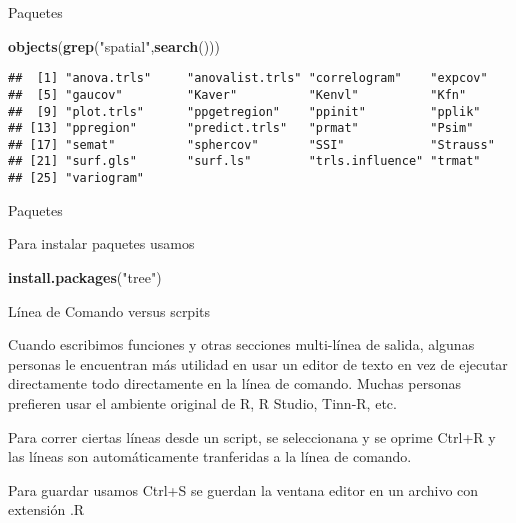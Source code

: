 \documentclass[ignorenonframetext,]{beamer}
\newenvironment{Shaded}{\begin{snugshade}}{\end{snugshade}}
\newcommand{\KeywordTok}[1]{\textcolor[rgb]{0.13,0.29,0.53}{\textbf{#1}}}
\newcommand{\StringTok}[1]{\textcolor[rgb]{0.31,0.60,0.02}{#1}}
\newcommand{\NormalTok}[1]{#1}
\begin{document}
\begin{frame}[fragile]{Paquetes}

\begin{Shaded}
\begin{Highlighting}[]
\KeywordTok{objects}\NormalTok{(}\KeywordTok{grep}\NormalTok{(}\StringTok{"spatial"}\NormalTok{,}\KeywordTok{search}\NormalTok{()))}
\end{Highlighting}
\end{Shaded}

\begin{verbatim}
##  [1] "anova.trls"     "anovalist.trls" "correlogram"    "expcov"        
##  [5] "gaucov"         "Kaver"          "Kenvl"          "Kfn"           
##  [9] "plot.trls"      "ppgetregion"    "ppinit"         "pplik"         
## [13] "ppregion"       "predict.trls"   "prmat"          "Psim"          
## [17] "semat"          "sphercov"       "SSI"            "Strauss"       
## [21] "surf.gls"       "surf.ls"        "trls.influence" "trmat"         
## [25] "variogram"
\end{verbatim}

\end{frame}

\begin{frame}[fragile]{Paquetes}

Para instalar paquetes usamos

\begin{Shaded}
\begin{Highlighting}[]
\KeywordTok{install.packages}\NormalTok{(}\StringTok{"tree"}\NormalTok{)}
\end{Highlighting}
\end{Shaded}

\end{frame}

\begin{frame}{Línea de Comando versus scrpits}

Cuando escribimos funciones y otras secciones multi-línea de salida,
algunas personas le encuentran más utilidad en usar un editor de texto
en vez de ejecutar directamente todo directamente en la línea de
comando. Muchas personas prefieren usar el ambiente original de R, R
Studio, Tinn-R, etc.

Para correr ciertas líneas desde un script, se seleccionana y se oprime
Ctrl+R y las líneas son automáticamente tranferidas a la línea de
comando.

Para guardar usamos Ctrl+S se guerdan la ventana editor en un archivo
con extensión .R

\end{frame}
\end{document}
